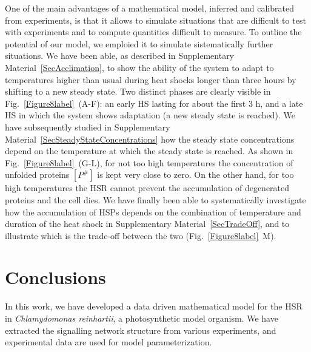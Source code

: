 \documentclass[oneside, 10pt, a4paper, twocolumn]{article}
\begin{document}
One of the main advantages of a mathematical model, inferred and calibrated from experiments, is that it allows to simulate situations that are difficult to test with experiments and to compute quantities difficult to measure. To outline the potential of our model, we emploied it to simulate sistematically further situations. 
We have been able, as described in Supplementary Material~\ref{SecAcclimation}, to show the ability of the system to adapt to temperatures higher than usual during heat shocks longer than three hours by shifting to a new steady state. Two distinct phases are clearly visible in Fig.~\ref{Figure8label}~(A-F): an early HS lasting for about the first $3$ h, and a late HS in which the system shows adaptation (a new steady state is reached). 
We have subsequently studied in Supplementary Material~\ref{SecSteadyStateConcentrations} how the steady state concentrations depend on the temperature at which the steady state is reached. As shown in Fig.~\ref{Figure8label}~(G-L), for not too high temperatures the concentration of unfolded proteins $\left[P^\#\right]$ is kept very close to zero. On the other hand, for too high temperatures the HSR cannot prevent the accumulation of degenerated proteins and the cell dies. 
We have finally been able to systematically investigate how the accumulation of HSPs depends on the combination of temperature and duration of the heat shock in Supplementary Material~\ref{SecTradeOff}, and to illustrate which is the trade-off between the two (Fig.~\ref{Figure8label}~M). 






\section{Conclusions}
\label{SectionConclusions}

In this work, we have developed a data driven mathematical model for the HSR in \emph{Chlamydomonas reinhartii}, a photosynthetic model organism. We have extracted the signalling network structure from various experiments, and experimental data are used for model parameterization.
\end{document}
